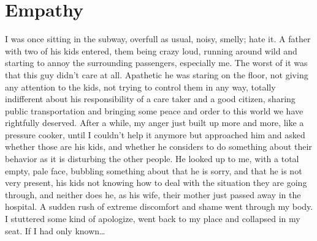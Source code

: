 \chapter{Empathy}\label{ch:empathy}

I was once sitting in the subway, overfull as usual, noisy, smelly; hate it.
A father with two of his kids entered, them being crazy loud, running around wild and starting to annoy the surrounding passengers, especially me.
The worst of it was that this guy didn't care at all.
Apathetic he was staring on the floor, not giving any attention to the kids, not trying to control them in any way, totally indifferent about his responsibility of a care taker and a good citizen, sharing public transportation and bringing some peace and order to this world we have rightfully deserved.
After a while, my anger just built up more and more, like a pressure cooker, until I couldn't help it anymore but approached him and asked whether those are his kids, and whether he considers to do something about their behavior as it is disturbing the other people.
He looked up to me, with a total empty, pale face, bubbling something about that he is sorry, and that he is not very present, his kids not knowing how to deal with the situation they are going through, and neither does he, as his wife, their mother just passed away in the hospital.
A sudden rush of extreme discomfort and shame went through my body.
I stuttered some kind of apologize, went back to my place and collapsed in my seat.
If I had only known\ldots





